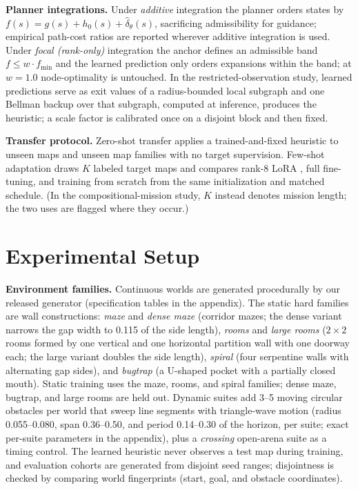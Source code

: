 \documentclass[letterpaper]{article} %
\begin{document}
\textbf{Planner integrations.} Under \emph{additive} integration the planner orders states by $f(s) = g(s) + h_0(s) + \hat\delta_\theta(s)$, sacrificing admissibility for guidance; empirical path-cost ratios are reported wherever additive integration is used. Under \emph{focal (rank-only)} integration the anchor defines an admissible band $f \leq w \cdot f_{\min}$ \citep{pohl1970,pearl1982semiadmissible} and the learned prediction only orders expansions within the band; at $w{=}1.0$ node-optimality is untouched. In the restricted-observation study, learned predictions serve as exit values of a radius-bounded local subgraph and one Bellman backup over that subgraph, computed at inference, produces the heuristic; a scale factor is calibrated once on a disjoint block and then fixed.

\textbf{Transfer protocol.} Zero-shot transfer applies a trained-and-fixed heuristic to unseen maps and unseen map families with no target supervision. Few-shot adaptation draws $K$ labeled target maps and compares rank-8 LoRA \citep{hu2021lora}, full fine-tuning, and training from scratch from the same initialization and matched schedule. (In the compositional-mission study, $K$ instead denotes mission length; the two uses are flagged where they occur.)

\section{Experimental Setup}

\textbf{Environment families.} Continuous worlds are generated procedurally by our released generator (specification tables in the appendix). The static hard families are wall constructions: \emph{maze} and \emph{dense maze} (corridor mazes; the dense variant narrows the gap width to 0.115 of the side length), \emph{rooms} and \emph{large rooms} ($2{\times}2$ rooms formed by one vertical and one horizontal partition wall with one doorway each; the large variant doubles the side length), \emph{spiral} (four serpentine walls with alternating gap sides), and \emph{bugtrap} (a U-shaped pocket with a partially closed mouth). Static training uses the maze, rooms, and spiral families; dense maze, bugtrap, and large rooms are held out. Dynamic suites add 3--5 moving circular obstacles per world that sweep line segments with triangle-wave motion (radius 0.055--0.080, span 0.36--0.50, and period 0.14--0.30 of the horizon, per suite; exact per-suite parameters in the appendix), plus a \emph{crossing} open-arena suite as a timing control. The learned heuristic never observes a test map during training, and evaluation cohorts are generated from disjoint seed ranges; disjointness is checked by comparing world fingerprints (start, goal, and obstacle coordinates).
\end{document}
